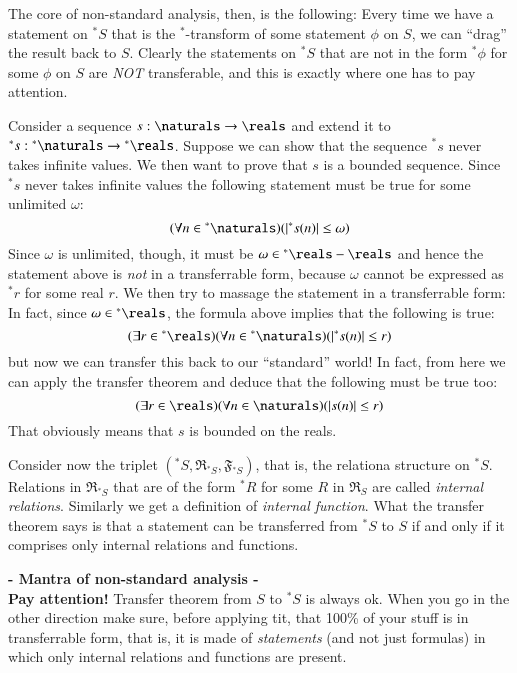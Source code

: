\documentclass[adraft, copyright,creativecommons,sharealike,noncommercial]{eptcs}
\newcommand{\nstar}{{^*}}
\begin{document}
%
The core of non-standard analysis, then, is the following: Every time we have a statement on $\nstar S$ that is the $\nstar$-transform of some statement $\phi$ on $S$, we can ``drag'' the result back to $S$. Clearly the statements on $\nstar S$ that are not in the form $\nstar \phi$ for some $\phi$ on $S$ are \emph{NOT} transferable, and this is exactly where one has to pay attention. 
\begin{example}
	Consider a sequence $s:\naturals \to \reals$ and extend it to $\nstar s:\nstar\naturals \to \nstar\reals$.
	Suppose we can show that the sequence $\nstar s$ never takes infinite values. We then want to prove that $s$ is a bounded sequence. Since $\nstar s$ never takes infinite values the following statement must be true for some unlimited $\omega$:
	\begin{equation*}
		(\forall n \in \nstar\naturals)(|\nstar s(n)| \leq \omega)
	\end{equation*}
	Since $\omega$ is unlimited, though, it must be $\omega \in \nstar \reals - \reals$ and hence the statement above is \emph{not} in a transferrable form, because $\omega$ cannot be expressed as $\nstar r$ for some real $r$. We then try to massage the statement in a transferrable form: In fact, since $\omega \in \nstar \reals$, the formula above implies that the following is true:
	\begin{equation*}
		(\exists r \in \nstar \reals)(\forall n \in \nstar\naturals)(|\nstar s(n)| \leq r)
	\end{equation*}
	but now we can transfer this back to our ``standard'' world! In fact, from here we can apply the transfer theorem and deduce that the following must be true too:
	\begin{equation*}
	(\exists r \in \reals)(\forall n \in \naturals)(|s(n)| \leq r)
	\end{equation*}	
	That obviously means that $s$ is bounded on the reals.
\end{example}
%
\begin{remark}
	Consider now the triplet $(\nstar S, \mathfrak{R}_{\nstar S}, \mathfrak{F}_{\nstar S})$, that is, the relationa structure on $\nstar S$. Relations in $\mathfrak{R}_{\nstar S}$ that are of the form $\nstar R$ for some $R$ in $\mathfrak{R}_{S}$ are called \emph{internal relations}. Similarly we get a definition of \emph{internal function}. What the transfer theorem says is that a statement can be transferred from $\nstar S$ to $S$ if and only if it comprises only internal relations and functions.
\end{remark}
%
\begin{center}
	\textbf{- Mantra of non-standard analysis -}\\
	\textbf{Pay attention!} Transfer theorem from $S$ to $\nstar S$ is always ok. When you go in the other direction make sure, before applying tit, that 100\% of your stuff is in transferrable form, that is, it is made of \emph{statements} (and not just formulas) in which only internal relations and functions are present.
\end{center}
\end{document}
